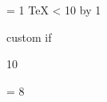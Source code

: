  = 1
\loop
  \TeX
\ifnum{} < 10
\advance{} by 1
\repeat


\if@director
 custom if
\else
\fi





 10

\counting

\newdimen\mydimen

\newcount { \mycounter }

\def\five{5}
\toks \five = 8
